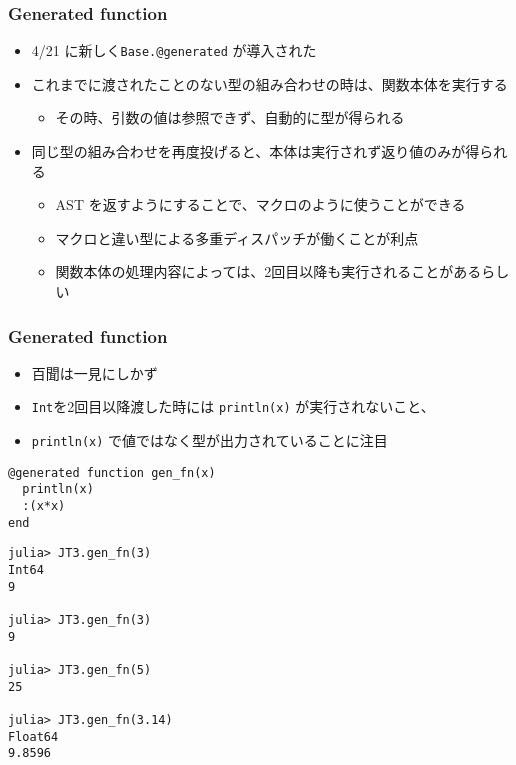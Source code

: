 \begin{frame}[containsverbatim]
\frametitle{Generated function}
\begin{itemize}
  \item 4/21 に新しく\verb|Base.@generated| が導入された
  \item これまでに渡されたことのない型の組み合わせの時は、関数本体を実行する
    \begin{itemize}
      \item その時、引数の値は参照できず、自動的に型が得られる
    \end{itemize}
  \item 同じ型の組み合わせを再度投げると、本体は実行されず返り値のみが得られる
    \begin{itemize}
      \item AST を返すようにすることで、マクロのように使うことができる
      \item マクロと違い型による多重ディスパッチが働くことが利点
      \item 関数本体の処理内容によっては、2回目以降も実行されることがあるらしい
    \end{itemize}
\end{itemize}
\end{frame}

\begin{frame}
\frametitle{Generated function}
\begin{itemize}
  \item 百聞は一見にしかず
  \item \verb|Int|を2回目以降渡した時には \verb|println(x)| が実行されないこと、
  \item \verb|println(x)| で値ではなく型が出力されていることに注目
\end{itemize}
\begin{lstlisting}
@generated function gen_fn(x)
  println(x)
  :(x*x)
end
\end{lstlisting}
\begin{lstlisting}
julia> JT3.gen_fn(3)
Int64
9

julia> JT3.gen_fn(3)
9

julia> JT3.gen_fn(5)
25

julia> JT3.gen_fn(3.14)
Float64
9.8596
\end{lstlisting}
\end{frame}

